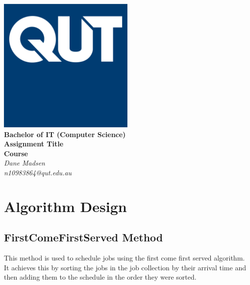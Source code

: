 \documentclass[12pt,a4paper]{article}
\begin{document}
	\begin{titlepage}
		
		\begin{center}
			\includegraphics[width=0.5\textwidth]{QUT.jpg}\\
			[0.03\textheight]  
			\Large\textbf{Bachelor of IT (Computer Science)}\\
			\Large\textbf{Assignment Title}\\
			\large\textbf{Course}\\
			[0.02\textheight]
			\large\textsl{Dane Madsen}\\
			\large\textsl{n10983864@qut.edu.au}
		\end{center}
		
	\end{titlepage}
	\tableofcontents
	\newpage
	
	\section{Algorithm Design}
		\subsection{FirstComeFirstServed Method}
			This method is used to schedule jobs using the first come first served algorithm. It achieves 
			this by sorting the jobs in the job collection by their arrival time and then adding them to 
			the schedule in the order they were sorted.\\
		
\end{document}
